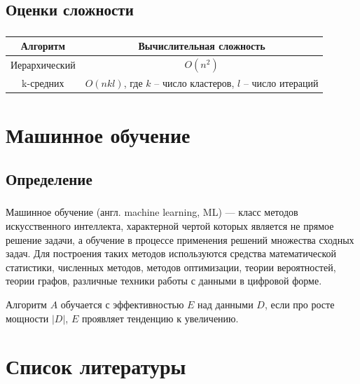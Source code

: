 \documentclass[t,aspectratio=169]{beamer}  %
\begin{document}
\subsection{Оценки сложности}

\begin{frame}
    \frametitle{\insertsection} 
    \framesubtitle{\insertsubsection}
    \begin{center}        
        \begin{tabular}{|c|c|}
            \hline Алгоритм & Вычислительная сложность \\ 
            \hline Иерархический & $O(n^2)$ \\ 
            \hline k-средних & $O(nkl)$, где $k$ – число кластеров, $l$ – число итераций \\ 
            \hline 
        \end{tabular} 
    \end{center}
\end{frame}

\section{Машинное обучение}
\subsection{Определение}

\begin{frame}
    \frametitle{\insertsection} 
    \framesubtitle{\insertsubsection}
    Машинное обучение (англ. machine learning, ML) — класс методов искусственного интеллекта, характерной чертой которых является не прямое решение задачи, а обучение в процессе применения решений множества сходных задач. Для построения таких методов используются средства математической статистики, численных методов, методов оптимизации, теории вероятностей, теории графов, различные техники работы с данными в цифровой форме\cite{wiki:ml_def}.
    
    \vspace{1cm}
    Алгоритм $A$ обучается с эффективностью $E$ над данными $D$, если про росте мощности $|D|$, $E$ проявляет тенденцию к увеличению.
\end{frame}


\section{Список литературы}
\begin{frame} 
    \frametitle{\insertsection}  
    \printbibliography
\end{frame}
\end{document}
